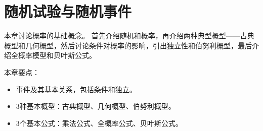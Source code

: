\chapter{随机试验与随机事件}

本章讨论概率的基础概念。
首先介绍随机和概率，再介绍两种典型概型——古典概型和几何概型，然后讨论条件对概率的影响，引出独立性和伯努利概型，最后介绍全概率模型和贝叶斯公式。

本章要点：
\begin{itemize}
    \item 事件及其基本关系，包括条件和独立。
    \item 3种基本概型：古典概型、几何概型、伯努利概型。
    \item 3个基本公式：乘法公式、全概率公式、贝叶斯公式。
\end{itemize}

\newpage


\newpage


\newpage


\newpage


\newpage


\newpage





